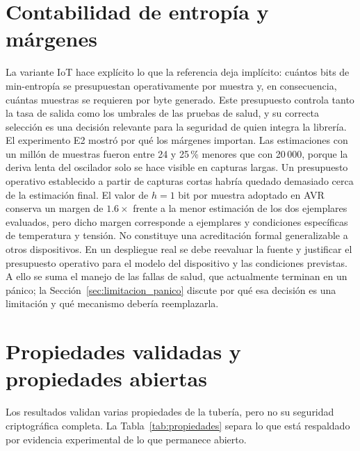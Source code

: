 \section{Contabilidad de entropía y márgenes}

La variante IoT hace explícito lo que la referencia deja implícito: cuántos bits de min-entropía se presupuestan operativamente por muestra y, en consecuencia, cuántas muestras se requieren por byte generado. Este presupuesto controla tanto la tasa de salida como los umbrales de las pruebas de salud, y su correcta selección es una decisión relevante para la seguridad de quien integra la librería. El experimento E2 mostró por qué los márgenes importan. Las estimaciones con un millón de muestras fueron entre 24 y 25\,\% menores que con 20\,000, porque la deriva lenta del oscilador solo se hace visible en capturas largas. Un presupuesto operativo establecido a partir de capturas cortas habría quedado demasiado cerca de la estimación final. El valor de $h=1$ bit por muestra adoptado en AVR conserva un margen de $1.6\times$ frente a la menor estimación de los dos ejemplares evaluados, pero dicho margen corresponde a ejemplares y condiciones específicas de temperatura y tensión. No constituye una acreditación formal generalizable a otros dispositivos. En un despliegue real se debe reevaluar la fuente y justificar el presupuesto operativo para el modelo del dispositivo y las condiciones previstas. A ello se suma el manejo de las fallas de salud, que actualmente terminan en un pánico; la Sección~\ref{sec:limitacion_panico} discute por qué esa decisión es una limitación y qué mecanismo debería reemplazarla.

\section{Propiedades validadas y propiedades abiertas}
\label{sec:propiedades}

Los resultados validan varias propiedades de la tubería, pero no su seguridad criptográfica completa. La Tabla~\ref{tab:propiedades} separa lo que está respaldado por evidencia experimental de lo que permanece abierto.

